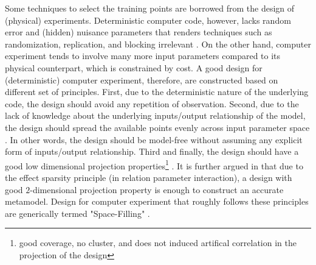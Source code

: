 Some techniques to select the training points are borrowed from the design of (physical) experiments.
Deterministic computer code, however, lacks random error and (hidden) nuisance parameters that renders techniques such as randomization, replication, and blocking irrelevant \cite{Santner2003}.
On the other hand, computer experiment tends to involve many more input parameters compared to its physical counterpart, which is constrained by cost. 
A good design for (deterministic) computer experiment, therefore, are constructed based on different set of principles.
First, due to the deterministic nature of the underlying code, the design should avoid any repetition of observation. 
Second, due to the lack of knowledge about the underlying inputs/output relationship of the model, the design should spread the available points evenly across input parameter space \cite{Santner2003}.
In other words, the design should be model-free without assuming any explicit form of inputs/output relationship.
Third and finally, the design should have a good low dimensional projection properties\footnote{good coverage, no cluster, and does not induced artifical correlation in the projection of the design} \cite{Jin2003,Damblin2013}.
It is further argued in \cite{Damblin2013} that due to the effect sparsity principle (in relation parameter interaction), 
a design with good $2$-dimensional projection property is enough to construct an accurate metamodel.   
Design for computer experiment that roughly follows these principles are generically termed "Space-Filling" \cite{Simpson2001a,Jin2003,Santner2003,Chen2006,Damblin2013}.


